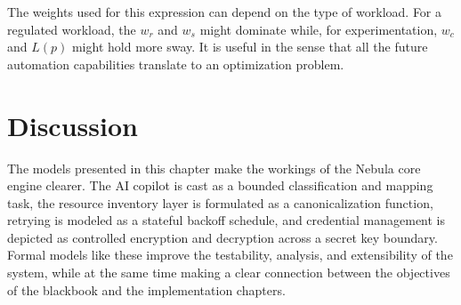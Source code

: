 The weights used for this expression can depend on the type of workload. For a regulated workload, the $w_r$ and $w_s$ might dominate while, for experimentation, $w_c$ and $L(p)$ might hold more sway. It is useful in the sense that all the future automation capabilities translate to an optimization problem.

\section{Discussion}
The models presented in this chapter make the workings of the Nebula core engine clearer. The AI copilot is cast as a bounded classification and mapping task, the resource inventory layer is formulated as a canonicalization function, retrying is modeled as a stateful backoff schedule, and credential management is depicted as controlled encryption and decryption across a secret key boundary. Formal models like these improve the testability, analysis, and extensibility of the system, while at the same time making a clear connection between the objectives of the blackbook and the implementation chapters.

\newpage
